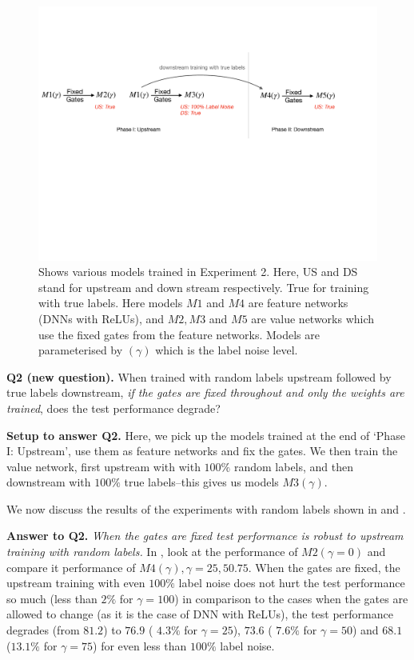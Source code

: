 \begin{figure}[h]
\centering
\includegraphics[scale=0.3]{figs/rand-label-big.pdf}
\caption{Shows various models trained in Experiment 2. Here, US and DS stand for upstream and down stream respectively. True for training with true labels. Here models $M1$ and $M4$ are feature networks (DNNs with ReLUs), and $M2, M3$ and $M5$ are value networks which use the fixed gates from the feature networks. Models are parameterised by $(\gamma)$ which is the label noise level.}
\label{fig:rand-label-setup}
\end{figure}


\textbf{Q2 (new question).} {When trained with random labels upstream followed by true labels downstream, \emph{if the gates are fixed throughout and only the weights are trained}, does the test performance degrade?}

\textbf{Setup to answer Q2.} Here, we pick up the models trained at the end of `Phase I: Upstream', use them as feature networks and fix the gates. We then train the value network, first upstream with with $100\%$ random labels, and then downstream with $100\%$ true labels--this gives us models $M3(\gamma)$.

We now discuss the results of the experiments with random labels shown in  and . 

\textbf{Answer to Q2.} \emph{When the gates are fixed test performance is robust to upstream training with random labels.} In  , look at the performance of $M2(\gamma=0)$ and compare it performance of  $M4(\gamma), \gamma=25,50.75$. When the gates are fixed, the upstream training with even $100\%$ label noise does not hurt the test performance so much (less than $2\%$ for $\gamma=100$) in comparison to the cases when the gates are allowed to change (as it is the case of DNN with ReLUs), the test performance degrades (from $81.2$) to $76.9$ ( $ 4.3\%$ for $\gamma=25$), $73.6$ ( $7.6\%$ for $\gamma=50$) and  $68.1$ ($13.1\%$ for $\gamma=75$) for even less than $100\%$ label noise.




